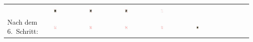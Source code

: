 \begin{tabular}{m{30mm}m{11mm}m{11mm}m{11mm}m{11mm}m{11mm}m{11mm}m{11mm}m{11mm}}
&
\includegraphics[width=0.08\textwidth]{./inf/SEKII/19_Java_Sortierverfahren/KaroBube.png}
&
\includegraphics[width=0.08\textwidth]{./inf/SEKII/19_Java_Sortierverfahren/KaroKoenig.png}
&
\includegraphics[width=0.08\textwidth]{./inf/SEKII/19_Java_Sortierverfahren/KaroDame.png}
&
\includegraphics[width=0.08\textwidth]{./inf/SEKII/19_Java_Sortierverfahren/KaroAs.png}
\\
Nach dem 6.\ Schritt: &
\includegraphics[width=0.08\textwidth]{./inf/SEKII/19_Java_Sortierverfahren/Karo7.png}
&
\includegraphics[width=0.08\textwidth]{./inf/SEKII/19_Java_Sortierverfahren/Karo8.png}
&
\includegraphics[width=0.08\textwidth]{./inf/SEKII/19_Java_Sortierverfahren/Karo9.png}
&
\includegraphics[width=0.08\textwidth]{./inf/SEKII/19_Java_Sortierverfahren/Karo10.png}
&
\includegraphics[width=0.08\textwidth]{./inf/SEKII/19_Java_Sortierverfahren/KaroBube.png}

\end{tabular}
